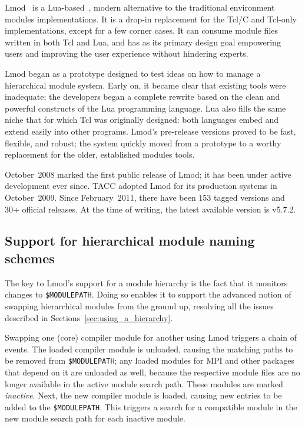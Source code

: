Lmod~\cite{laytonLmod,taccSecretSauce,taccLmod} is a Lua-based~\cite{LuaBook},
modern alternative to the traditional environment modules implementations.
It is a drop-in replacement for the Tcl/C
and Tcl-only implementations, except for a few corner cases.
It can consume module files written in both Tcl and
Lua, and has as its primary design goal empowering users
and improving the user experience without hindering experts.

Lmod began as a prototype designed to test ideas on how to manage a hierarchical
module system.  Early on, it became clear that existing tools were inadequate; 
the developers began a complete rewrite based on the clean
and powerful constructs of the Lua programming language.
Lua also fills the same niche that for which Tcl was
originally designed: both languages embed and extend easily into
other programs.  Lmod's pre-release versions proved to be
fast, flexible, and robust; the system quickly moved from
a prototype to a worthy replacement for the older, established modules tools.

October~2008 marked the first public release of Lmod; it has been under active
development ever since. TACC adopted Lmod for its production systems in October~2009.
Since February~2011, there have been 153 tagged versions and 30+ official releases.
At the time of writing, the latest available version is v5.7.2.

\subsection{Support for hierarchical module naming schemes}

The key to Lmod's support for a module hierarchy is the fact that it monitors
changes to \texttt{\small \$MODULEPATH}. Doing so enables it to support the
advanced notion of swapping hierarchical modules from the ground up, resolving all
the issues described in Sections~\ref{sec:using_a_hierarchy}.

Swapping one (core) compiler module for another using Lmod triggers
a chain of events.  The loaded compiler module is unloaded, 
causing the matching paths to be removed from \texttt{\small \$MODULEPATH}; 
 any loaded modules for MPI and other packages that depend on it
are unloaded as well, because the respective module files are no longer available
in the active module search path. These modules are marked \emph{inactive}.
Next, the new compiler module is loaded, causing new entries
to be added to the \texttt{\small \$MODULEPATH}. This triggers a search
for a compatible module in the new module search path for each inactive module.

